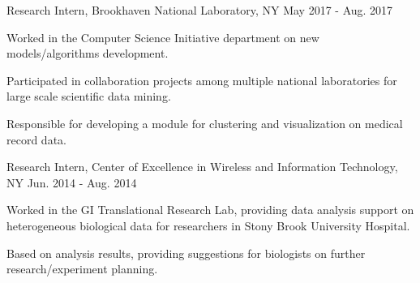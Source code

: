 


\begin{cventries}


\eduentry
{Research Intern, Brookhaven National Laboratory, NY} %
{May 2017 - Aug. 2017} %
{ %
\begin{cvitems}
\item{Worked in the Computer Science Initiative department on new models/algorithms development.}
\item{Participated in collaboration projects among multiple national laboratories for large scale scientific data mining.}
\item{Responsible for developing a module for clustering and visualization on medical record data.}
\end{cvitems}
}


\eduentry
{Research Intern, Center of Excellence in Wireless and Information Technology, NY} %
{Jun. 2014 - Aug. 2014} %
{ %
\begin{cvitems}
\item {Worked in the GI Translational Research Lab, providing data analysis support on heterogeneous biological data for researchers in Stony Brook University Hospital.}
\item {Based on analysis results, providing suggestions for biologists on further research/experiment planning.}
\end{cvitems}
}


\end{cventries}
